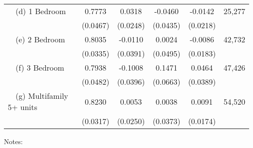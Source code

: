 \begin{table}
\begin{tabular}{@{}lccccc@{}}
        $\quad$(d) 1 Bedroom                                 &  0.7773  &  0.0318  &  -0.0460  &  -0.0142  & 25,277 \\
                                                             & (0.0467) & (0.0248) & (0.0435) & (0.0218) &      \\
        $\quad$(e) 2 Bedroom                                 &  0.8035  &  -0.0110  &  0.0024  &  -0.0086  & 42,732 \\
                                                             & (0.0335) & (0.0391) & (0.0495) & (0.0183) &      \\
        $\quad$(f) 3 Bedroom                                 &  0.7938  &  -0.1008  &  0.1471  &  0.0464  & 47,426 \\
                                                             & (0.0482) & (0.0396) & (0.0663) & (0.0389) &      \\
        $\quad$(g) Multifamily 5+ units                      &  0.8230  &  0.0053  &  0.0038  &  0.0091  & 54,520 \\
                                                             & (0.0317) & (0.0250) & (0.0373) & (0.0174) &      \\ \bottomrule
    \end{tabular}

    \begin{minipage}{.95\textwidth} \footnotesize
        \vspace{2mm}
        Notes: 
        
    \end{minipage}
\end{table}
